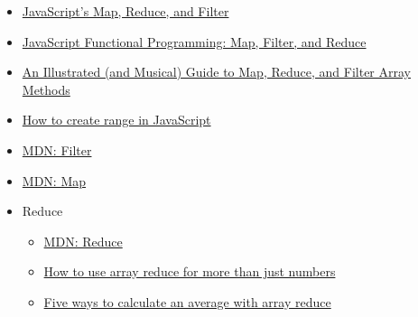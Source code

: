 \begin{itemize}[leftmargin=*]
    \item \href{https://danmartensen.svbtle.com/javascripts-map-reduce-and-filter}{JavaScript's Map, Reduce, and Filter}
    \item \href{https://medium.com/jsguru/javascript-functional-programming-map-filter-and-reduce-846ff9ba492d}{JavaScript Functional Programming: Map, Filter, and Reduce}
    \item \href{https://css-tricks.com/an-illustrated-and-musical-guide-to-map-reduce-and-filter-array-methods/}{An Illustrated (and Musical) Guide to Map, Reduce, and Filter Array Methods}
    \item \href{https://dev.to/ycmjason/how-to-create-range-in-javascript-539i}{How to create range in JavaScript}
    \item \href{https://developer.mozilla.org/en-US/docs/Web/JavaScript/Reference/Global_Objects/Array/filter}{MDN: Filter}
    \item \href{https://developer.mozilla.org/en-US/docs/Web/JavaScript/Reference/Global_Objects/Array/map}{MDN: Map}
    \item Reduce
        \begin{itemize}
            \item \href{https://developer.mozilla.org/en-US/docs/Web/JavaScript/Reference/Global_Objects/Array/Reduce}{MDN: Reduce}
            \item \href{https://jrsinclair.com/articles/2019/functional-js-do-more-with-reduce/}{How to use array reduce for more than just numbers}
            \item \href{https://jrsinclair.com/articles/2019/five-ways-to-average-with-js-reduce/}{Five ways to calculate an average with array reduce}
        \end{itemize}
\end{itemize}
